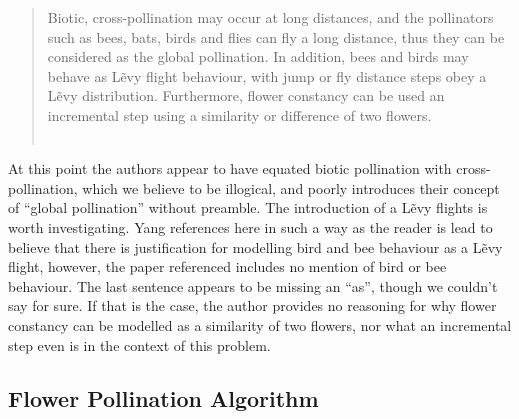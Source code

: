 \begin{quotation}
Biotic, cross-pollination may occur at long distances, and the pollinators such as bees, bats, birds and flies can fly a long distance, thus they can be considered as the global pollination. In addition, bees and birds may behave as L\~evy flight behaviour, with jump or fly distance steps obey a L\~evy distribution. Furthermore, flower constancy can be used an incremental step using a similarity or difference of two flowers.\\~\\
\end{quotation}
At this point the authors appear to have equated biotic pollination with cross-pollination, which we believe to be illogical, and poorly introduces their concept of ``global pollination'' without preamble.
The introduction of a L\~evy flights is worth investigating. Yang references \cite{pavlyukevich2007levy} here in such a way as the reader is lead to believe that there is justification for modelling bird and bee behaviour as a L\~evy flight, however, the paper referenced includes no mention of bird or bee behaviour. 
The last sentence appears to be missing an ``as'', though we couldn't say for sure. If that is the case, the author provides no reasoning for why flower constancy can be modelled as a similarity of two flowers, nor what an incremental step even is in the context of this problem.


\subsection{Flower Pollination Algorithm}

